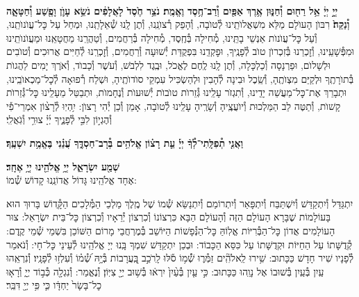 \documentclass[twoside, openany, parskip=half, 11pt]{book}
\begin{document}
\pesicha

\begin{sometimes}

\\
 \textbf{יְיָ֣ יְיָ֔ אֵ֥ל רַח֖וּם וְ֯חַנּ֑וּן אֶ֥רֶךְ אַפַּ֖יִם וְ֯רַב־חֶ֥סֶד וֶאֱמֶֽת׃ נֹצֵ֥ר חֶ֙סֶד֙ לָאֲלָפִ֔ים נֹשֵׂ֥א עָוֺ֛ן וָפֶ֖שַׁע וְ֯חַטָּאָ֑ה וְ֯נַקֵּה֙׃}
רִבּוֺן הָעוׂלָם מַלֵּא מִשְׁאֲלוׂתֵֽינוּ לְ֯טוׂבָה, וְ֯הָפֵק רְ֯צוׂנֵֽנוּ, וְ֯תֶן לָֽנוּ שְׁ֯אֵלָתֵֽנוּ, וּמְחַל עַל כׇּל־עֲוׂנוׂתֵֽנוּ, וְ֯עַל כׇּל־עֲוׂנוׂת אַנְשֵׁי בָתֵּֽינוּ, מְ֯חִילָה בְּ֯חֶֽסֶד, מְ֯חִילָה בְּ֯רַחֲמִים, וְ֯טַהֲרֵֽנוּ מֵחֲטָאֵֽנוּ וּמֵעֲוׂנוׂתֵֽינוּ וּמִפְּ֯שָׁעֵֽינוּ, וְ֯זׇכְרֵנוּ בְּ֯זִכְרוׂן טוׂב לְ֯פָנֶֽיךָ, וּפׇקְדֵֽנוּ בִּפְקֻדַּת יְ֯שׁוּעָה וְ֯רַחֲמִים, וְ֯זׇכְרֵֽנוּ לְ֯חַיִּים אֲרוּכִים וְ֯טוׂבִים וּלְשָׁלוׂם, וּפַרְנָסָה וְ֯כַלְכָּלָה, וְ֯תֶן לָֽנוּ לֶֽחֶם לֶאֱכׂל, וּבֶֽגֶד לִלְבּׂשׁ, וְ֯עׂשֶׁר וְ֯כָבוׂד, וְ֯אׂרֶךְ יָמִים לַהֲגוׂת בְּ֯תוׂרָתֶֽךָ וּלְקַיֵּם מִצְוׂתֶֽהָ, וְ֯שֵֽׂכֶל וּבִינָה לְ֯הָבִין וּלְהַשְׂכִּיל עִמְקֵי סוׂדוׂתֶֽיהָ, וּשְׁלַח רְ֯פוּאָה לְ֯כׇל־מַכְאוׂבֵֽינוּ, וּתְבָרֵךְ אֶת־כׇּל־מַעֲשֵׁה יָדֵֽינוּ, וְ֯תִגְזׂר עָלֵֽינוּ גְּ֯זֵרוׂת טוׂבוׂת יְ֯שׁוּעוׂת וְ֯נֶחָמוׂת, וּתְבַטֵּל מֵעָלֵֽינוּ כׇּל־גְּ֯זֵרוׂת קָשׁוׂת, וְ֯תַטֶּה לֵב הַמַּלְכוּת וְ֯יוׂעֲצֶֽיהָ וְ֯שָׂרֶֽיהָ עָלֵֽינוּ לְ֯טוׂבָה, אָמֵן וְ֯כֵן יְ֯הִי רָצוׂן:
%
יִ֥הְיֽוּ לְ֯רָצ֨וֹן אִמְרֵי־פִ֡י וְ֯הֶגְי֣וֹן לִבִּ֣י לְ֯פָנֶ֑יךָ יְ֜יָ֗ צוּרִ֥י וְ֯גֹֽאֲלִֽי׃


\textbf{וַאֲנִ֤י תְ֯פִלָּֽתִי־לְ֯ךָ֨ יְיָ֡ עֵ֤ת רָצ֗וֹן אֱלֹהִ֥ים בְּ֯רָב־חַסְדֶּ֑ךָ עֲ֝נֵ֗נִי בֶּאֱמֶ֥ת יִשְׁעֶֽךָ׃}

\end{sometimes}

\textbf{שְׁמַ֖ע יִשְׂרָאֵ֑ל יְיָ֥ אֱלֹהֵ֖ינוּ יְיָ֥ אֶחָֽד׃}\\

אֶחָד אֱלֹהֵֽינוּ גָּדוֹל אֲדוֹנֵֽנוּ קָדוֹשׁ שְׁ֯מוֹ:

\gadlu

\label{al hakol}
יִתְגַּדַּל וְ֯יִתְקַדַּשׁ וְ֯יִשְׁתַּבַּח וְ֯יִתְפָּאַר וְ֯יִתְרוֹמַם וְ֯יִתְנַשֵּׂא שְׁ֯מוֹ שֶׁל מֶֽלֶךְ מַלְכֵי הַמְּ֯לָכִים הַקְָּ֯דוֹשׁ בָּרוּךְ הוּא בָּעוֹלָמוֹת שֶׁבָּרָא הָעוֹלָם הַזֶּה וְ֯הָעוֹלָם הַבָּא כִּרְצוֹנוֹ וְ֯כִרְצוֹן יְ֯רֵאָיו וְ֯כִרְצוֹן כׇּל־בֵּית יִשְׂרָאֵל: צוּר הָעוֹלָמִים אֲדוֹן כׇּל־הַבְּ֯רִיּוֹת אֱלֽוֹהַּ כׇּל־הַנְּ֯פָשׁוֹת הַיּוֹשֵׁב בְּ֯מֶרְחֲבֵי מָרוֹם הַשּׁוֹכֵן בִּשְׁמֵי שְׁ֯מֵי קֶֽדֶם: קְ֯דֻשָּׁתוֹ עַל הַחַיּוֹת וּקְדֻשָּׁתוֹ עַל כִּסֵּא הַכָּבוֹד: וּבְכֵן יִתְקַדַּשׁ שִׁמְךָ בָּֽנוּ יְיָ אֱלֹהֵֽינוּ לְ֯עֵינֵי כׇּל־חָי: וְ֯נֹאמַר לְ֯פָנָיו שִׁיר חָדָשׁ כַּכָּתוּב:
שִׁ֥ירוּ לֵֽאלֹהִֽ֘ים זַמְּ֯ר֢וּ שְׁ֯֫מ֥וֹ סֹ֡לּוּ לָֽרֹכֵ֣ב בָּֽ֭עֲרָבוֹת בְּ֯יָ֥הּ שְׁ֯֝מ֗וֹ וְ֯עִלְז֥וּ לְ֯פָנָֽיו׃ וְ֯נִרְאֵֽהוּ עַֽיִן בְּ֯עַֽיִן בְּ֯שׁוּבוֹ אֶל נָוֵֽהוּ כַּכָּתוּב:
%
כִּ֣י עַ֤יִן בְּ֯עַ֨יִן֙ יִרְא֔וּ בְּ֯שׁ֥וּב יְיָ֖ צִיּֽוֹן׃ וְ֯נֶאֱמַר:
וְ֯נִגְלָ֖ה כְּ֯ב֣וֹד יְיָ֑ וְ֯רָא֤וּ כׇל־בָּשָׂר֙ יַחְדָּ֔ו כִּ֛י פִּ֥י יְיָ֖ דִּבֵּֽר׃
\end{document}
